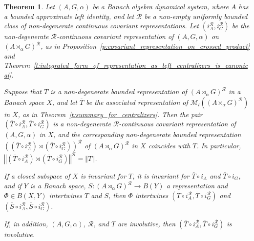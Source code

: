 \documentclass{amsart}
\theoremstyle{plain}
\newtheorem{theorem}{Theorem}[section]
\theoremstyle{definition}
\numberwithin{equation}{section}
\begin{document}
\begin{theorem}\label{t:r_affiliated_from_crossed_product_to_dyn_sys}
Let ${(A,G,\alpha)}$ be a Banach algebra dynamical system, where $A$ has a bounded approximate left identity, and let ${\mathcal R}$ be a non-empty uniformly bounded class of non-degenerate continuous covariant representations. Let $(i_A^{\mathcal R}, i_G^{\mathcal R})$ be the non-degenerate ${\mathcal R}$-continuous covariant representation of ${(A,G,\alpha)}$ on ${(A {\rtimes}_\alpha G)^\mathcal{R}}$, as in Proposition~\ref{p:covariant_representation_on_crossed_product} and Theorem~\ref{t:integrated_form_of_representation_as_left_centralizers_is_canonical}.

Suppose that $T$ is a non-degenerate bounded representation of ${(A {\rtimes}_\alpha G)^\mathcal{R}}$ in a Banach space $X$, and let $\overline T$ be the associated representation of $\mathcal M_l({(A {\rtimes}_\alpha G)^\mathcal{R}})$ in $X$, as in Theorem~\ref{t:summary_for_centralizers}. Then the pair $(\overline{T} \circ i_A^{\mathcal R}, \overline{T} \circ i_G^{\mathcal R})$ is a non-degenerate ${\mathcal R}$-continuous covariant representation of ${(A,G,\alpha)}$ in $X$, and the corresponding non-degenerate bounded representation $\left((\overline{T} \circ i_A^{\mathcal R}){\rtimes} (\overline{T} \circ i_G^{\mathcal R})\right)^{\mathcal R}$ of ${(A {\rtimes}_\alpha G)^\mathcal{R}}$ in $X$ coincides with $T$. In particular, ${\left\Vert {(\overline{T} \circ i_A^{\mathcal R}){\rtimes} (\overline{T} \circ i_G^{\mathcal R})} \right\Vert^{\mathcal R}}={\left\Vert {T} \right\Vert}$.

If a closed subspace of $X$ is invariant for $T$, it is invariant for $\overline{T} \circ i_A$ and $\overline{T} \circ i_G$, and if $Y$ is a Banach space, $S: {(A {\rtimes}_\alpha G)^\mathcal{R}} \to B(Y)$ a representation and $\Phi \in B(X,Y)$ intertwines $T$ and $S$, then $\Phi$ intertwines $(\overline{T} \circ i_A^{\mathcal R}, \overline{T} \circ i_G^{\mathcal R})$ and $(\overline{S} \circ i_A^{\mathcal R}, \overline{S} \circ i_G^{\mathcal R})$.

If, in addition, ${(A,G,\alpha)}$, $\mathcal{R}$, and $T$ are involutive, then $(\overline{T} \circ i_A^{\mathcal R}, \overline{T} \circ i_G^{\mathcal R})$ is involutive.
\end{theorem}
\end{document}
